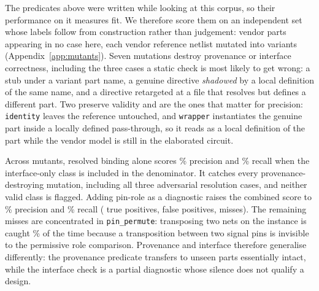 The predicates above were written while looking at this corpus, so their
performance on it measures fit. We therefore score them on an independent set
whose labels follow from construction rather than judgement: \MutParts{}
vendor parts appearing in no case here, each vendor reference netlist mutated
into \MutClasses{} variants (Appendix~\ref{app:mutants}). Seven mutations
destroy provenance or interface correctness, including the three cases a
static check is most likely to get wrong: a stub under a variant part name, a
genuine directive \emph{shadowed} by a local definition of the same name, and
a directive retargeted at a file that resolves but defines a different part.
Two preserve validity and are the ones that matter for precision:
\texttt{identity} leaves the reference untouched, and \texttt{wrapper}
instantiates the genuine part inside a locally defined pass-through, so it
reads as a local definition of the part while the vendor model is still in the
elaborated circuit.

Across \MutTotal{} mutants, resolved binding alone scores
\MutProvPrecision{}\% precision and \MutProvRecall{}\% recall when the
interface-only class is included in the denominator. It catches every
provenance-destroying mutation, including all three adversarial resolution
cases, and neither valid class is flagged. Adding pin-role as a diagnostic
raises the combined score to \MutPrecision{}\% precision and
\MutRecall{}\% recall (\MutTP{} true positives, \MutFP{} false positives,
\MutFN{} misses). The remaining misses are concentrated in
\texttt{pin\_permute}: transposing two nets on the instance is caught
\MutPinPermuteRate{}\% of the time because a transposition between two signal
pins is invisible to the permissive role comparison. Provenance and interface
therefore generalise differently: the provenance predicate transfers to
unseen parts essentially intact, while the interface check is a partial
diagnostic whose silence does not qualify a design.


